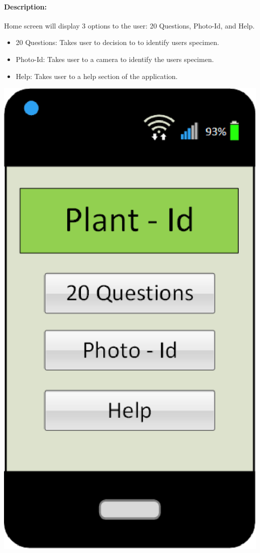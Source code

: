 \documentclass[a4paper]{article}
\begin{document}
\paragraph{Description:}Home screen will display 3 options to the user: 20 Questions, Photo-Id, and Help.
\begin{itemize}
\item 20 Questions: Takes user to decision to to identify users specimen.
\item Photo-Id: Takes user to a camera to identify the users specimen.
\item Help: Takes user to a help section of the application. 
\end{itemize}
\begin{center}\includegraphics[scale=.8]{HomeScreen.eps}\end{center}
\pagebreak
\end{document}
